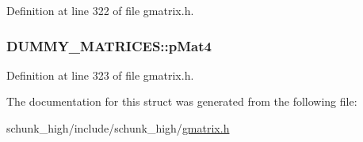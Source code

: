 Definition at line 322 of file gmatrix.\-h.

\hypertarget{structDUMMY__MATRICES_a90bf8e9779c6de5e65b4a93341efddba}{
\subsubsection[{p\-Mat4}]{ D\-U\-M\-M\-Y\-\_\-\-M\-A\-T\-R\-I\-C\-E\-S\-::p\-Mat4}}\label{structDUMMY__MATRICES_a90bf8e9779c6de5e65b4a93341efddba}


Definition at line 323 of file gmatrix.\-h.



The documentation for this struct was generated from the following file\-:\begin{DoxyCompactItemize}
\item 
schunk\-\_\-high/include/schunk\-\_\-high/\hyperlink{gmatrix_8h}{gmatrix.\-h}\end{DoxyCompactItemize}
